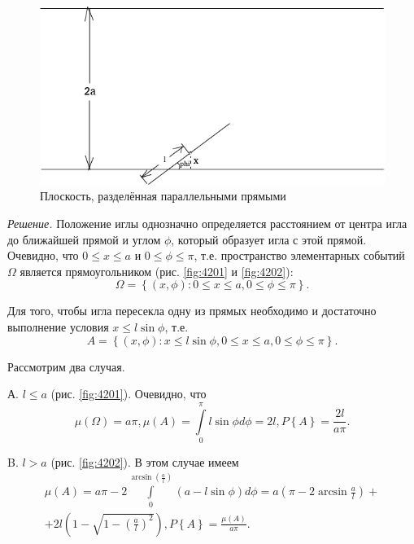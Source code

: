 \documentclass{book}
\begin{document}
\begin{figure}[h!]
  \centering
  \includegraphics[width=.9\textwidth]{./pictures/4_2.png}
  \caption{Плоскость, разделённая параллельными прямыми}
  \label{fig:42}
\end{figure}

\textit{Решение.}  Положение иглы однозначно определяется расстоянием от центра игла до ближайшей прямой и углом $ \phi $, который образует игла с этой прямой.
Очевидно, что $0 \leq x \leq a$ и $0 \leq \phi \leq \pi $, т.е. пространство элементарных событий $ \Omega $ является прямоугольником (рис. \ref{fig:4201} и \ref{fig:4202}):
$$ \Omega =
\left\{ \left( x, \phi \right):
0 \leq x \leq a,
0 \leq \phi \leq \pi \right\}.$$

Для того, чтобы игла пересекла одну из прямых необходимо и достаточно выполнение условия
$x \leq l \sin \phi$, т.е.
$$A =
\left\{ \left( x, \phi \right):
x \leq l \sin \phi,
0 \leq x \leq a,
0 \leq \phi \leq \pi \right\}.$$

Рассмотрим два случая.

А. $l \leq a$ (рис. \ref{fig:4201}).
Очевидно, что
$$ \mu \left( \Omega \right) =
a \pi,
\mu \left( A \right) =
\int \limits_{0}^{ \pi } l \sin \phi d \phi =
2l,
P \left\{ A \right\} =
\frac{2l}{a \pi}.$$

B. $l > a$ (рис. \ref{fig:4202}).
В этом случае имеем
\begin{equation*}
\begin{split}
\mu \left( A \right) =
a \pi - 2 \int \limits_{0}^{\arcsin \left( \frac{a}{l} \right) } \left( a - l \sin \phi \right) d \phi =
a \left( \pi - 2 \arcsin \frac{a}{l} \right) + \\
+ 2l \left( 1 - \sqrt{1 - \left( \frac{a}{l} \right)^2} \right),
P \left\{ A \right\} =
\frac{ \mu \left( A \right) }{a \pi}.
\end{split}
\end{equation*}
\end{document}
